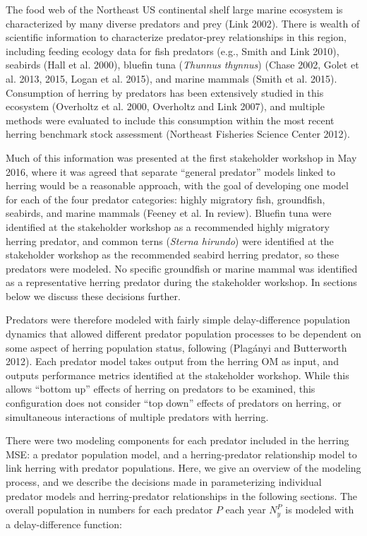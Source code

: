 \documentclass[]{article}
\begin{document}
The food web of the Northeast US continental shelf large marine
ecosystem is characterized by many diverse predators and prey (Link
2002). There is wealth of scientific information to characterize
predator-prey relationships in this region, including feeding ecology
data for fish predators (e.g., Smith and Link 2010), seabirds (Hall et
al. 2000), bluefin tuna (\emph{Thunnus thynnus}) (Chase 2002, Golet et
al. 2013, 2015, Logan et al. 2015), and marine mammals (Smith et al.
2015). Consumption of herring by predators has been extensively studied
in this ecosystem (Overholtz et al. 2000, Overholtz and Link 2007), and
multiple methods were evaluated to include this consumption within the
most recent herring benchmark stock assessment (Northeast Fisheries
Science Center 2012).

Much of this information was presented at the first stakeholder workshop
in May 2016, where it was agreed that separate ``general predator''
models linked to herring would be a reasonable approach, with the goal
of developing one model for each of the four predator categories: highly
migratory fish, groundfish, seabirds, and marine mammals (Feeney et al.
In review). Bluefin tuna were identified at the stakeholder workshop as
a recommended highly migratory herring predator, and common terns
(\emph{Sterna hirundo}) were identified at the stakeholder workshop as
the recommended seabird herring predator, so these predators were
modeled. No specific groundfish or marine mammal was identified as a
representative herring predator during the stakeholder workshop. In
sections below we discuss these decisions further.

Predators were therefore modeled with fairly simple delay-difference
population dynamics that allowed different predator population processes
to be dependent on some aspect of herring population status, following
(Plagányi and Butterworth 2012). Each predator model takes output from
the herring OM as input, and outputs performance metrics identified at
the stakeholder workshop. While this allows ``bottom up'' effects of
herring on predators to be examined, this configuration does not
consider ``top down'' effects of predators on herring, or simultaneous
interactions of multiple predators with herring.

There were two modeling components for each predator included in the
herring MSE: a predator population model, and a herring-predator
relationship model to link herring with predator populations. Here, we
give an overview of the modeling process, and we describe the decisions
made in parameterizing individual predator models and herring-predator
relationships in the following sections. The overall population in
numbers for each predator \(P\) each year \(N_{y}^P\) is modeled with a
delay-difference function:
\end{document}
